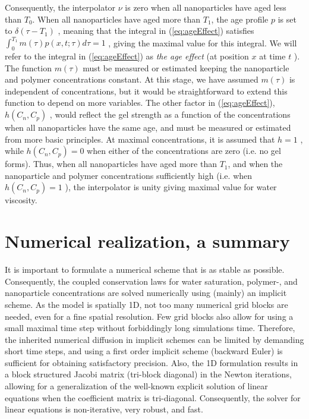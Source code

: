 Consequently, the interpolator  $\nu$ is zero when all nanoparticles have aged less than  $T_0$. When all nanoparticles have aged more than  $T_1$, the age profile $p$ is set to  $\delta(\tau-T_1)$ , meaning that the integral in (\ref{eq:ageEffect}) satisfies $\int^{T_1}_{0}m(\tau)p(x,t;\tau)d\tau=1$ , giving the maximal value for this integral. We will refer to the integral in (\ref{eq:ageEffect})  as \textit{the age effect} (at position $x$ at time $t$ ). The function $m(\tau)$ must be measured or estimated keeping the nanoparticle and polymer concentrations constant. At this stage, we have assumed  $m(\tau)$ is independent of concentrations, but it would be straightforward to extend this function to depend on more variables. The other factor in (\ref{eq:ageEffect}), $h(C_n,C_p)$ , would reflect the gel strength as a function of the concentrations when all nanoparticles have the same age, and must be measured or estimated from more basic principles. At maximal concentrations, it is assumed that $h=1$ , while $h(C_n,C_p)=0$ when either of the concentrations are zero (i.e. no gel forms). Thus, when all nanoparticles have aged more than $T_1$, and when the nanoparticle and polymer concentrations sufficiently high (i.e. when $h(C_n,C_p)=1$ ), the interpolator is unity giving maximal value for water viscosity.

\section{Numerical realization, a summary}
It is important to formulate a numerical scheme that is as stable as possible. Consequently, the coupled conservation laws for water saturation, polymer-, and nanoparticle concentrations are solved numerically using (mainly) an implicit scheme. As the model is spatially 1D, not too many numerical grid blocks are needed, even for a fine spatial resolution. Few grid blocks also allow for using a small maximal time step without forbiddingly long simulations time. Therefore, the inherited numerical diffusion in implicit schemes can be limited by demanding short time steps, and using a first order implicit scheme (backward Euler) is sufficient for obtaining satisfactory precision. Also, the 1D formulation results in a block structured Jacobi matrix (tri-block diagonal) in the Newton iterations, allowing for a generalization of the well-known explicit solution of linear equations when the coefficient matrix is tri-diagonal. Consequently, the solver for linear equations is non-iterative, very robust, and fast. 

